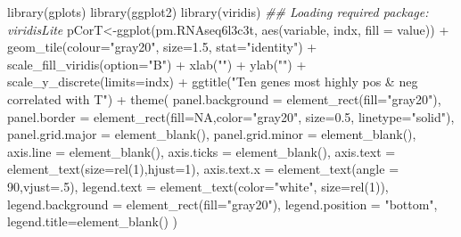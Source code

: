 \documentclass[]{article}
\newcommand{\hlnum}[1]{\textcolor[rgb]{0.816,0.125,0.439}{#1}}%
\newcommand{\hlstr}[1]{\textcolor[rgb]{0.251,0.627,0.251}{#1}}%
\newcommand{\hlcom}[1]{\textcolor[rgb]{0.502,0.502,0.502}{\textit{#1}}}%
\newcommand{\hlstd}[1]{\textcolor[rgb]{0.251,0.251,0.251}{#1}}%
\newenvironment{Shaded}{\begin{myshaded}}{\end{myshaded}}
\newcommand{\DecValTok}[1]{\hlnum{#1}}
\newcommand{\FloatTok}[1]{\hlnum{#1}}
\newcommand{\ConstantTok}[1]{\hlnum{#1}}
\newcommand{\SpecialCharTok}[1]{\hlstr{#1}}
\newcommand{\StringTok}[1]{\hlstr{#1}}
\newcommand{\DocumentationTok}[1]{\hlcom{#1}}
\newcommand{\OtherTok}[1]{{#1}}
\newcommand{\FunctionTok}[1]{\hlstd{#1}}
\newcommand{\AttributeTok}[1]{{#1}}
\newcommand{\NormalTok}[1]{\hlstd{#1}}
\begin{document}
\begin{Shaded}
\begin{Highlighting}[]
\FunctionTok{library}\NormalTok{(gplots)}
\FunctionTok{library}\NormalTok{(ggplot2)}
\FunctionTok{library}\NormalTok{(viridis)}
\DocumentationTok{\#\# Loading required package: viridisLite}
\NormalTok{pCorT}\OtherTok{\textless{}{-}}\FunctionTok{ggplot}\NormalTok{(pm.RNAseq6l3c3t, }\FunctionTok{aes}\NormalTok{(variable, indx, }\AttributeTok{fill =}\NormalTok{ value)) }\SpecialCharTok{+}
  \FunctionTok{geom\_tile}\NormalTok{(}\AttributeTok{colour=}\StringTok{"gray20"}\NormalTok{, }\AttributeTok{size=}\FloatTok{1.5}\NormalTok{, }\AttributeTok{stat=}\StringTok{"identity"}\NormalTok{) }\SpecialCharTok{+}
  \FunctionTok{scale\_fill\_viridis}\NormalTok{(}\AttributeTok{option=}\StringTok{"B"}\NormalTok{) }\SpecialCharTok{+}
  \FunctionTok{xlab}\NormalTok{(}\StringTok{""}\NormalTok{) }\SpecialCharTok{+}  \FunctionTok{ylab}\NormalTok{(}\StringTok{""}\NormalTok{) }\SpecialCharTok{+}
  \FunctionTok{scale\_y\_discrete}\NormalTok{(}\AttributeTok{limits=}\NormalTok{indx) }\SpecialCharTok{+}
  \FunctionTok{ggtitle}\NormalTok{(}\StringTok{"Ten genes most highly pos \& neg correlated with T"}\NormalTok{) }\SpecialCharTok{+}
  \FunctionTok{theme}\NormalTok{(}
    \AttributeTok{panel.background =} \FunctionTok{element\_rect}\NormalTok{(}\AttributeTok{fill=}\StringTok{"gray20"}\NormalTok{),}
    \AttributeTok{panel.border =} \FunctionTok{element\_rect}\NormalTok{(}\AttributeTok{fill=}\ConstantTok{NA}\NormalTok{,}\AttributeTok{color=}\StringTok{"gray20"}\NormalTok{, }\AttributeTok{size=}\FloatTok{0.5}\NormalTok{, }\AttributeTok{linetype=}\StringTok{"solid"}\NormalTok{),}
    \AttributeTok{panel.grid.major =} \FunctionTok{element\_blank}\NormalTok{(),}
    \AttributeTok{panel.grid.minor =} \FunctionTok{element\_blank}\NormalTok{(),}
    \AttributeTok{axis.line =} \FunctionTok{element\_blank}\NormalTok{(),}
    \AttributeTok{axis.ticks =} \FunctionTok{element\_blank}\NormalTok{(),}
    \AttributeTok{axis.text =} \FunctionTok{element\_text}\NormalTok{(}\AttributeTok{size=}\FunctionTok{rel}\NormalTok{(}\DecValTok{1}\NormalTok{),}\AttributeTok{hjust=}\DecValTok{1}\NormalTok{),}
    \AttributeTok{axis.text.x =} \FunctionTok{element\_text}\NormalTok{(}\AttributeTok{angle =} \DecValTok{90}\NormalTok{,}\AttributeTok{vjust=}\NormalTok{.}\DecValTok{5}\NormalTok{),}
    \AttributeTok{legend.text =} \FunctionTok{element\_text}\NormalTok{(}\AttributeTok{color=}\StringTok{"white"}\NormalTok{, }\AttributeTok{size=}\FunctionTok{rel}\NormalTok{(}\DecValTok{1}\NormalTok{)),}
    \AttributeTok{legend.background =} \FunctionTok{element\_rect}\NormalTok{(}\AttributeTok{fill=}\StringTok{"gray20"}\NormalTok{),}
    \AttributeTok{legend.position =} \StringTok{"bottom"}\NormalTok{,}
    \AttributeTok{legend.title=}\FunctionTok{element\_blank}\NormalTok{()}
\NormalTok{)}
\end{Highlighting}
\end{Shaded}
\end{document}
